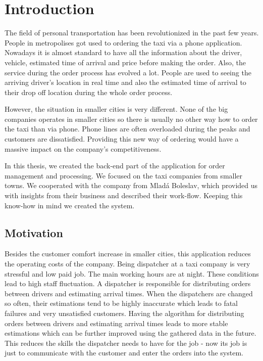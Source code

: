 \chapter{Introduction}

The field of personal transportation has been revolutionized in the past few years. People in metropolises got used to ordering the taxi via a phone application. Nowadays it is almost standard to have all the information about the driver, vehicle, estimated time of arrival and price before making the order. Also, the service during the order process has evolved a lot. People are used to seeing the arriving driver's location in real time and also the estimated time of arrival to their drop off location during the whole order process. 

However, the situation in smaller cities is very different. None of the big companies operates in smaller cities so there is usually no other way how to order the taxi than via phone. Phone lines are often overloaded during the peaks and customers are dissatisfied. Providing this new way of ordering would have a massive impact on the company's competitiveness.

In this thesis, we created the back-end part of the application for order management and processing. We focused on the taxi companies from smaller towns. We cooperated with the company from Mladá Boleslav, which provided us with insights from their business and described their work-flow. Keeping this know-how in mind we created the system.

\section{Motivation}

Besides the customer comfort increase in smaller cities, this application reduces the operating costs of the company. Being dispatcher at a taxi company is very stressful and low paid job. The main working hours are at night. These conditions lead to high staff fluctuation. A dispatcher is responsible for distributing orders between drivers and estimating arrival times. When the dispatchers are changed so often, their estimations tend to be highly inaccurate which leads to fatal failures and very unsatisfied customers. Having the algorithm for distributing orders between drivers and estimating arrival times leads to more stable estimations which can be further improved using the gathered data in the future. This reduces the skills the dispatcher needs to have for the job - now its job is just to communicate with the customer and enter the orders into the system.

